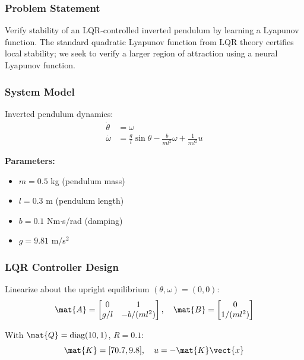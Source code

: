 \subsubsection{Problem Statement}

Verify stability of an LQR-controlled inverted pendulum by learning a Lyapunov function. The standard quadratic Lyapunov function from LQR theory certifies local stability; we seek to verify a larger region of attraction using a neural Lyapunov function.

\subsubsection{System Model}

Inverted pendulum dynamics:
\begin{align}
\dot{\theta} &= \omega \\
\dot{\omega} &= \frac{g}{l}\sin\theta - \frac{b}{ml^2}\omega + \frac{1}{ml^2}u
\end{align}

\textbf{Parameters:}
\begin{itemize}
    \item $m = 0.5$ kg (pendulum mass)
    \item $l = 0.3$ m (pendulum length)
    \item $b = 0.1$ Nm$\cdot$s/rad (damping)
    \item $g = 9.81$ m/s$^2$
\end{itemize}

\subsubsection{LQR Controller Design}

Linearize about the upright equilibrium $(\theta, \omega) = (0, 0)$:
\begin{equation}
\mat{A} = \begin{bmatrix} 0 & 1 \\ g/l & -b/(ml^2) \end{bmatrix}, \quad
\mat{B} = \begin{bmatrix} 0 \\ 1/(ml^2) \end{bmatrix}
\end{equation}

With $\mat{Q} = \text{diag}(10, 1)$, $R = 0.1$:
\begin{equation}
\mat{K} = [70.7, 9.8], \quad u = -\mat{K}\vect{x}
\end{equation}

